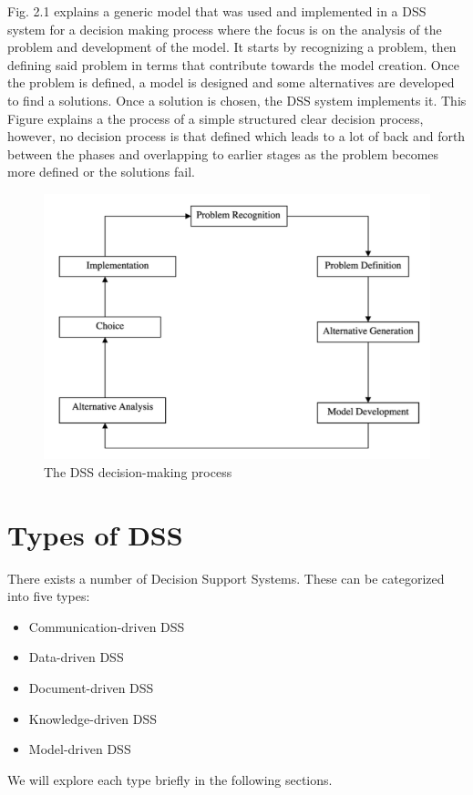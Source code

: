 \indent Fig. 2.1 explains a generic model that was used and implemented in a DSS system for a decision making process where the focus is on the analysis of the problem and development of the model. It starts by recognizing a problem, then defining said problem in terms that contribute towards the model creation. Once the problem is defined, a model is designed and some alternatives are developed to find a solutions. Once a solution is chosen, the DSS system implements it. This Figure explains a the process of a simple structured clear decision process, however, no decision process is that defined which leads to a lot of back and forth between the phases and overlapping to earlier stages as the problem becomes more defined or the solutions fail.\cite{shim2002past}
\begin{figure}[H]
\centering
\includegraphics[scale=0.4]{Images/decisionSuppotProcess.png}
\caption[The DSS decision-making process]{The DSS decision-making process \cite{shim2002past}}
\end{figure}
\section{Types of DSS}
\label{sub:TypesOfDSS}
There exists a number of Decision Support Systems. These can be categorized into five types:
\begin{itemize} 
	\item Communication-driven DSS  
	\item Data-driven DSS 
	\item Document-driven DSS 
	\item Knowledge-driven DSS 
	\item Model-driven DSS 
\end{itemize} 
We will explore each type briefly in the following sections.

